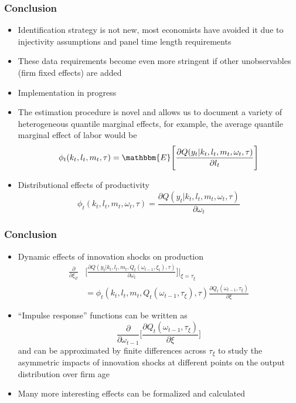 \documentclass{beamer}
\begin{document}

\begin{frame}
\frametitle{Conclusion}
\begin{itemize}
	\item Identification strategy is not new, most economists have avoided it due to injectivity assumptions and panel time length requirements
	\item These data requirements become even more stringent if other unobservables (firm fixed effects) are added
	\item Implementation in progress
	\item The estimation procedure is novel and allows us to document a variety of heterogeneous quantile marginal effects, for example, the average quantile marginal effect of labor would be
	\begin{equation}
	\phi_{t}(k_{t}, l_{t}, m_{t}, \tau)=\mathbbm{E}\Bigg[\frac{\partial Q(y_{t}|k_{t}, l_{t}, m_{t}, \omega_{t}, \tau)}{\partial l_{t}}\Bigg]
	\end{equation}
	\item Distributional effects of productivity
	\begin{equation}
	\phi_{t}(k_{t}, l_{t}, m_{t}, \omega_{t}, \tau)=\frac{\partial Q(y_{t}|k_{t}, l_{t}, m_{t}, \omega_{t}, \tau)}{\partial \omega_{t}}
	\end{equation}
\end{itemize}
\end{frame}


\begin{frame}
\frametitle{Conclusion}
\begin{itemize}
	\item Dynamic effects of innovation shocks on production
	\begin{equation}
	\begin{split}
	\frac{\partial}{\partial \xi_{it}}&\Bigg[\frac{\partial Q(y_{t}|k_{t}, l_{t}, m_{t}, Q_{t}(\omega_{t-1}, \xi_{t}), \tau)}{\partial \omega_{t}}\Bigg]\Bigg|_{\xi=\tau_{\xi}}\\
	&=\phi_{t}(k_{t}, l_{t}, m_{t}, Q_{t}(\omega_{t-1}, \tau_{\xi}), \tau)\frac{\partial Q_{t}(\omega_{t-1}, \tau_{\xi})}{\partial \xi}
	\end{split}
	\end{equation}
	\item ``Impulse response'' functions can be written as
	\begin{equation}
	\frac{\partial}{\partial \omega_{t-1}}\Bigg[\frac{\partial Q_{t}(\omega_{t-1}, \tau_{\xi})}{\partial \xi}\Bigg]
	\end{equation}
	and can be approximated by finite differences across $\tau_{\xi}$ to study the asymmetric impacts of innovation shocks at different points on the output distribution over firm age
	\item Many more interesting effects can be formalized and calculated
\end{itemize}

\end{frame}
\end{document}
